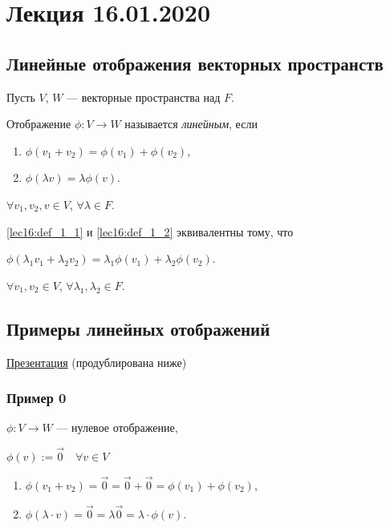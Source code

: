 \section{Лекция 16.01.2020}

\subsection{Линейные отображения векторных пространств}

Пусть $V$, $W$ --- векторные пространства над $F$.

\begin{definition}
    Отображение $\phi : V \to W$ называется \textit{линейным}, если
    \begin{enumerate}
    \item \label{lec16:def_1_1}$\phi(v_1 + v_2) = \phi(v_1) + \phi(v_2)$,
    \item \label{lec16:def_1_2} $\phi(\lambda v) = \lambda \phi(v)$.
    \end{enumerate}

    $\forall v_1, v_2, v \in V$, $\forall \lambda \in F$.
\end{definition}

\begin{exercise}
    \ref{lec16:def_1_1} и \ref{lec16:def_1_2} эквивалентны тому, что 

    $\phi(\lambda_1 v_1 + \lambda_2 v_2) = \lambda_1 \phi(v_1) + \lambda_2 \phi(v_2)$.

    $\forall v_1, v_2 \in V$, $\forall \lambda_1, \lambda_2 \in F$.
\end{exercise}

\subsection{Примеры линейных отображений}

\href{https://www.dropbox.com/s/t2or1ihptvg7xe6/LM_examples.pdf?dl=0}{Презентация} (продублирована ниже)

\subsubsection{Пример 0}

$\phi: V \to W$ --- нулевое отображение,

$\phi(v) := \overrightarrow{0} \quad \forall v \in V$

\bigskip
\begin{enumerate}[label=\arabic*), nosep]
\item $\phi(v_1 + v_2) = \overrightarrow{0} = \overrightarrow{0} + \overrightarrow{0} = \phi(v_1) + \phi(v_2)$,
\item $\phi(\lambda \cdot v) = \overrightarrow{0} = \lambda \overrightarrow{0} = \lambda \cdot \phi(v)$.
\end{enumerate}

